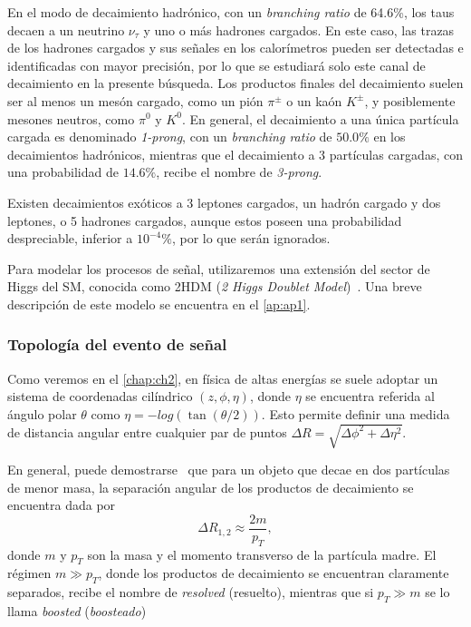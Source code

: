 En el modo de decaimiento hadrónico, con un \textit{branching ratio} de 64.6\%, los taus decaen a un neutrino $\nu_\tau$ y uno o más hadrones cargados. En este caso, las trazas de los hadrones cargados y sus señales en los calorímetros pueden ser detectadas e identificadas con mayor precisión, por lo que se estudiará solo este canal de decaimiento en la presente búsqueda. Los productos finales del decaimiento suelen ser al menos un mesón cargado, como un pión $\pi^\pm$ o un kaón $K^\pm$, y posiblemente mesones neutros, como $\pi^0$ y $K^0$. En general, el decaimiento a una única partícula cargada es denominado \textit{1-prong}, con un \textit{branching ratio} de $50.0\%$ en los decaimientos hadrónicos, mientras que el decaimiento a 3 partículas cargadas, con una probabilidad de $14.6\%$, recibe el nombre de \textit{3-prong}.

Existen decaimientos exóticos a 3 leptones cargados, un hadrón cargado y dos leptones, o 5 hadrones cargados, aunque estos poseen una probabilidad despreciable, inferior a $10^{-4}\%$, por lo que serán ignorados.

Para modelar los procesos de señal, utilizaremos una extensión del sector de Higgs del SM, conocida como 2HDM (\textit{2 Higgs Doublet Model})~\cite{Degrande2015a,Jurciukonis2019}. Una breve descripción de este modelo se encuentra en el \cref{ap:ap1}.

\vspace{1em}
\subsubsection{Topología del evento de señal}

Como veremos en el \cref{chap:ch2}, en física de altas energías se suele adoptar un sistema de coordenadas cilíndrico $(z,\phi,\eta)$, donde $\eta$ se encuentra referida al ángulo polar $\theta$ como $\eta = -log(\tan(\theta/2))$. Esto permite definir una medida de distancia angular entre cualquier par de puntos $\Delta R = \sqrt{\Delta\phi^2 + \Delta\eta^2}$.

En general, puede demostrarse~\cite{Han2017} que para un objeto que decae en dos partículas de menor masa, la separación angular de los productos de decaimiento se encuentra dada por
\[ \Delta R_{1,2} \approx \frac{2m}{p_T} \label{eq:ch1:ditau:angular_sep}, \]
donde $m$ y $p_T$ son la masa y el momento transverso de la partícula madre. El régimen $m \gg p_T$, donde los productos de decaimiento se encuentran claramente separados, recibe el nombre de \textit{resolved} (resuelto), mientras que si $p_T \gg m$ se lo llama \textit{boosted} (\textit{boosteado})

